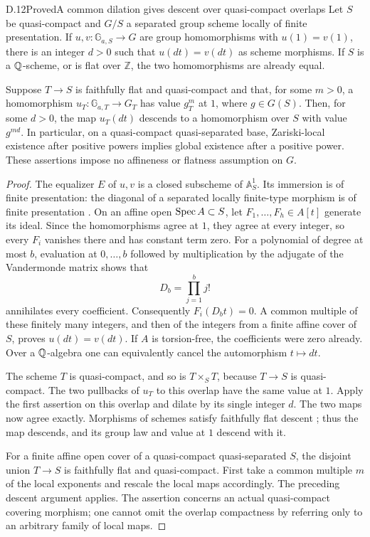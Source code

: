 \begin{statement}{D.12}{Proved}{A common dilation gives descent over quasi-compact overlaps}
Let $S$ be quasi-compact and $G/S$ a separated group scheme locally of
finite presentation. If $u,v:\mathbb G_{a,S}\to G$ are group
homomorphisms with $u(1)=v(1)$, there is an integer $d>0$ such that
$u(dt)=v(dt)$ as scheme morphisms. If $S$ is a $\mathbb Q$-scheme, or is flat
over $\mathbb Z$, the two homomorphisms are already equal.

Suppose $T\to S$ is faithfully flat and quasi-compact and that, for
some $m>0$, a homomorphism $u_T:\mathbb G_{a,T}\to G_T$ has value
$g_T^m$ at $1$, where $g\in G(S)$. Then, for some $d>0$, the map
$u_T(dt)$ descends to a homomorphism over $S$ with value $g^{md}$.
In particular, on a quasi-compact quasi-separated base, Zariski-local
existence after positive powers implies global existence after a positive
power. These assertions impose no affineness or flatness assumption on $G$.
\end{statement}
\begin{proof}
The equalizer $E$ of $u,v$ is a closed subscheme of $\mathbb A^1_S$.
Its immersion is of finite presentation: the diagonal of a separated
locally finite-type morphism is of finite presentation
\citep[Lemma 29.22.12, Tag 0818]{DN_StacksDiagonal}.
On an affine open $\operatorname{Spec} A\subset S$, let $F_1,\ldots,F_h\in A[t]$
generate its ideal. Since the homomorphisms agree at $1$, they agree at
every integer, so every $F_i$ vanishes there and has constant term zero.
For a polynomial of degree at most $b$, evaluation at $0,\ldots,b$
followed by multiplication by the adjugate of the Vandermonde matrix
shows that
\[
             D_b=\prod_{j=1}^b j!
\]
annihilates every coefficient. Consequently $F_i(D_bt)=0$. A common
multiple of these finitely many integers, and then of the integers from
a finite affine cover of $S$, proves $u(dt)=v(dt)$. If $A$ is
torsion-free, the coefficients were zero already. Over a $\mathbb Q$-algebra
one can equivalently cancel the automorphism $t\mapsto dt$.

The scheme $T$ is quasi-compact, and so is $T\times_S T$, because
$T\to S$ is quasi-compact. The two pullbacks of $u_T$ to this overlap
have the same value at $1$. Apply the first assertion on this overlap
and dilate by its single integer $d$. The two maps now agree exactly.
Morphisms of schemes satisfy faithfully flat descent
\citep[Lemma 35.35.11 and Remark 35.35.12, Tag 040L]{DN_StacksDescent};
thus the map descends, and its group law and value at $1$ descend with it.

For a finite affine open cover of a quasi-compact quasi-separated $S$,
the disjoint union $T\to S$ is faithfully flat and quasi-compact.
First take a common multiple $m$ of the local exponents and rescale the
local maps accordingly. The preceding descent argument applies.
The assertion concerns an actual quasi-compact covering morphism;
one cannot omit the overlap compactness by referring only to an
arbitrary family of local maps.
\end{proof}

